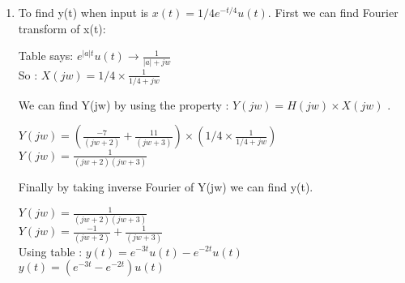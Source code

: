 \documentclass[10pt,a4paper, margin=1in]{article}
\begin{document}
\begin{enumerate}
\begin{enumerate}
    \item 
    To find y(t) when input is $x(t) = 1/4e^{-t/4}u(t)$. First we can find Fourier transform of x(t):
    \begin{center}
        Table says: $e^{|a|t}u(t) \longrightarrow \frac{1}{|a|+jw}$ \\$ $ \\
        So : $X(jw) = 1/4\times\frac{1}{1/4+jw}$ \\
    \end{center}
    We can find Y(jw) by using the property : $Y(jw) = H(jw)\times X(jw)$ .
    \begin{center}
        $Y(jw) = (\frac{-7}{(jw + 2)} + \frac{11}{(jw + 3)}) \times (1/4\times\frac{1}{1/4+jw})$\\$ $ \\
         $Y(jw) = \frac{1}{(jw + 2)(jw+3)}$\\$ $ \\
    \end{center}
    Finally by taking inverse Fourier of Y(jw) we can find y(t).
    \begin{center}
        $Y(jw) = \frac{1}{(jw + 2)(jw+3)}$\\$ $ \\
        $Y(jw) = \frac{-1}{(jw + 2)}+\frac{1}{(jw+3)}$\\$ $ \\
        Using table : $y(t) = e^{-3t}u(t) - e^{-2t}u(t)$\\$ $ \\
        $y(t) = (e^{-3t} - e^{-2t})u(t)$
    \end{center}
\end{enumerate}
\end{enumerate}
\end{document}

